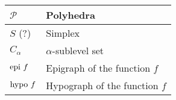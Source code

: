 \begin{xltabular}{\textwidth}{XX}
	\(\mathcal{P}\) \cite[sec. 2.2.4]{boydConvexOptimization2004}                                                                                                         & Polyhedra                                                                                                                                                                                                      \\ \hline
	\(S\) (?)                                                                                                                                                             & Simplex                                                                                                                                                                                                        \\ \hline
	\(C_\alpha\) \cite[sec. 3.1.6]{boydConvexOptimization2004}                                                                                                            & \(\alpha\)-sublevel set                                                                                                                                                                                        \\ \hline
	\(\textnormal{epi } f\)  \cite[sec. 3.1.7]{boydConvexOptimization2004}                                                                                                & Epigraph of the function \(f\)                                                                                                                                                                                 \\ \hline
	\(\textnormal{hypo } f\) \cite[sec 3.1.7]{boydConvexOptimization2004}                                                                                                 & Hypograph of the function \(f\)
\end{xltabular}

